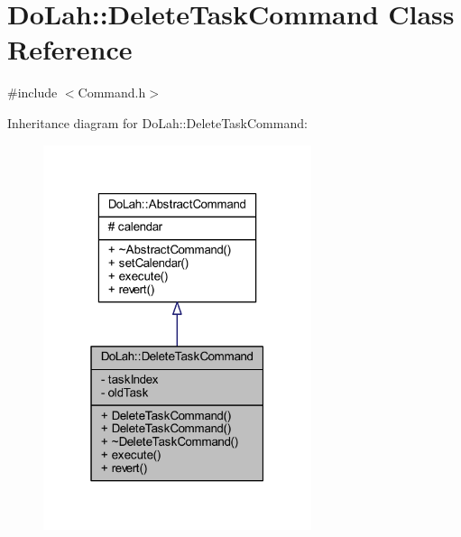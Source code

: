 \hypertarget{class_do_lah_1_1_delete_task_command}{}\section{Do\+Lah\+:\+:Delete\+Task\+Command Class Reference}
\label{class_do_lah_1_1_delete_task_command}


{\ttfamily \#include $<$Command.\+h$>$}



Inheritance diagram for Do\+Lah\+:\+:Delete\+Task\+Command\+:\nopagebreak
\begin{figure}[H]
\begin{center}
\leavevmode
\includegraphics[width=223pt]{class_do_lah_1_1_delete_task_command__inherit__graph}
\end{center}
\end{figure}


